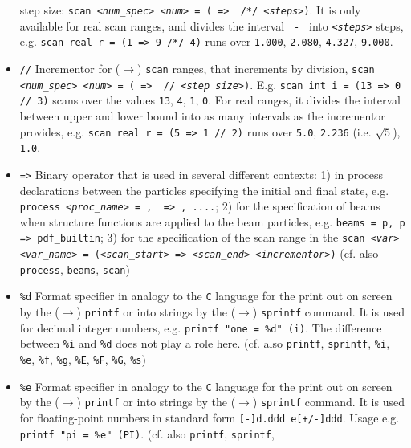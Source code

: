 \documentclass[12pt]{book}
\newcommand{\ttt}[1]{\texttt{#1}}
\begin{document}
\begin{itemize}
step size: \ttt{scan {\em <num\_spec>} {\em <num>} = ({\em <lower val>} => {\em <upper val>}
/*/ {\em <steps>})}. It is only available for real scan ranges, and divides
the interval \ttt{{\em <upper val>} - {\em <lower val>}} into \ttt{{\em <steps>}} steps,
e.g. \ttt{scan real r = (1 => 9 /*/ 4)} runs over \ttt{1.000},
\ttt{2.080}, \ttt{4.327}, \ttt{9.000}.
\item
\ttt{//} \newline
Incrementor for ($\to$) \ttt{scan} ranges, that increments by division,
\ttt{scan {\em <num\_spec>} {\em <num>} = ({\em <lower val>} => {\em <upper val>} // {\em <step
size>})}. E.g. \ttt{scan int i = (13 => 0 // 3)} scans over the values \ttt{13},
\ttt{4}, \ttt{1}, \ttt{0}. For real ranges, it divides the interval
between upper and lower bound into as many intervals as the incrementor
provides, e.g. \ttt{scan real r = (5 => 1 // 2)} runs over
\ttt{5.0}, \ttt{2.236} (i.e. $\sqrt{5}$), \ttt{1.0}.
\item
\ttt{=>} \newline
Binary operator that is used in several different contexts: 1) in
process declarations between the particles specifying the
initial and final state, e.g. \ttt{process {\em <proc\_name>} = {\em <in1>}, {\em <in2>}
=> {\em <out1>}, ....}; 2) for the specification of beams when
structure functions are applied to the beam particles, e.g. \ttt{beams
= p, p => pdf\_builtin}; 3) for the specification of the scan range in
the \ttt{scan {\em <var>} {\em <var\_name>} = ({\em <scan\_start>} => {\em <scan\_end>}
  {\em <incrementor>})} (cf. also \ttt{process}, \ttt{beams}, \ttt{scan})
\item
\ttt{\%d} \newline
Format specifier in analogy to the \ttt{C} language for the print out
on screen by the ($\to$) \ttt{printf} or into strings by the ($\to$)
\ttt{sprintf} command. It is used for decimal integer numbers,
e.g. \ttt{printf "one = \%d" (i)}. The difference between \ttt{\%i}
and \ttt{\%d} does not play a role here. (cf. also \ttt{printf}, \ttt{sprintf},
\ttt{\%i}, \ttt{\%e}, \ttt{\%f}, \ttt{\%g}, \ttt{\%E}, \ttt{\%F},
\ttt{\%G}, \ttt{\%s})
\item
\ttt{\%e} \newline
Format specifier in analogy to the \ttt{C} language for the print out
on screen by the ($\to$) \ttt{printf} or into strings by the ($\to$)
\ttt{sprintf} command. It is used for floating-point numbers in
standard form \ttt{[-]d.ddd e[+/-]ddd}. Usage e.g. \ttt{printf "pi =
\%e" (PI)}.  (cf. also \ttt{printf}, \ttt{sprintf},

\end{itemize}
\end{document}
